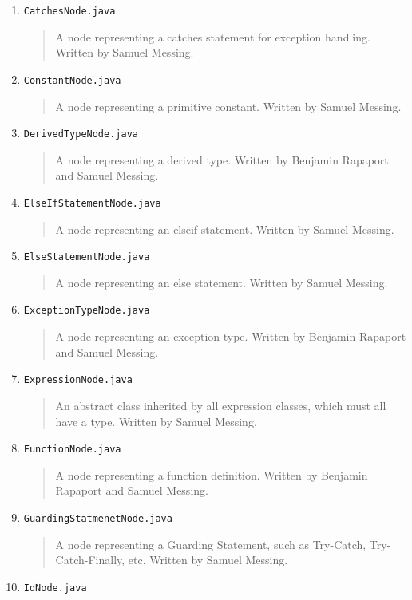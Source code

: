 \documentclass{report}
\begin{document}
\begin{itemize}
\begin{enumerate}
\item \texttt{CatchesNode.java}
\begin{quotation}
\noindent A node representing a catches statement for exception handling. Written by Samuel Messing.
\end{quotation}
\item \texttt{ConstantNode.java}
\begin{quotation}
\noindent A node representing a primitive constant. Written by Samuel Messing.
\end{quotation}
\item \texttt{DerivedTypeNode.java}
\begin{quotation}
\noindent  A node representing a derived type. Written by Benjamin Rapaport and Samuel Messing.
\end{quotation}
\item \texttt{ElseIfStatementNode.java}
\begin{quotation}
\noindent A node representing an elseif statement. Written by Samuel Messing.
\end{quotation}
\item \texttt{ElseStatementNode.java}
\begin{quotation}
\noindent A node representing an else statement. Written by Samuel Messing.
\end{quotation}
\item \texttt{ExceptionTypeNode.java}
\begin{quotation}
\noindent A node representing an exception type. Written by Benjamin Rapaport and Samuel Messing.
\end{quotation}
\item \texttt{ExpressionNode.java}
\begin{quotation}
\noindent An abstract class inherited by all expression classes, which must all have a type. Written by Samuel Messing.
\end{quotation}
\item \texttt{FunctionNode.java}
\begin{quotation}
\noindent A node representing a function definition. Written by Benjamin Rapaport and Samuel Messing.
\end{quotation}
\item \texttt{GuardingStatmenetNode.java}
\begin{quotation}
\noindent A node representing a Guarding Statement, such as Try-Catch, Try-Catch-Finally, etc. Written by Samuel Messing.
\end{quotation}
\item \texttt{IdNode.java}

\end{enumerate}
\end{itemize}
\end{document}
